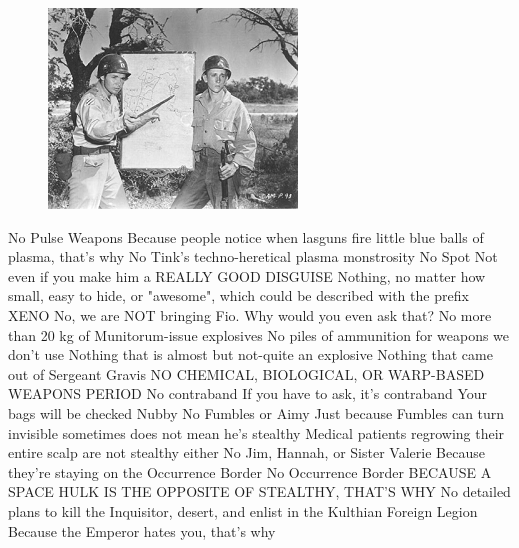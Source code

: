 \begin{figure}
	\begin{center}
		\includegraphics[width=\figwidth]{pics/17/4.png}
	\end{center}
\end{figure}



No Pulse Weapons
Because people notice when lasguns fire little blue balls of plasma, that's why
No Tink's techno-heretical plasma monstrosity
No Spot
Not even if you make him a REALLY GOOD DISGUISE
Nothing, no matter how small, easy to hide, or "awesome", which could be described with the prefix XENO
No, we are NOT bringing Fio. 
Why would you even ask that?
No more than 20 kg of Munitorum-issue explosives
No piles of ammunition for weapons we don't use
Nothing that is almost but not-quite an explosive
Nothing that came out of Sergeant Gravis
NO CHEMICAL, BIOLOGICAL, OR WARP-BASED WEAPONS PERIOD
No contraband
If you have to ask, it's contraband
Your bags will be checked Nubby
No Fumbles or Aimy
Just because Fumbles can turn invisible sometimes does not mean he's stealthy
Medical patients regrowing their entire scalp are not stealthy either
No Jim, Hannah, or Sister Valerie
Because they're staying on the Occurrence Border
No Occurrence Border
BECAUSE A SPACE HULK IS THE OPPOSITE OF STEALTHY, THAT'S WHY
No detailed plans to kill the Inquisitor, desert, and enlist in the Kulthian Foreign Legion
Because the Emperor hates you, that's why



